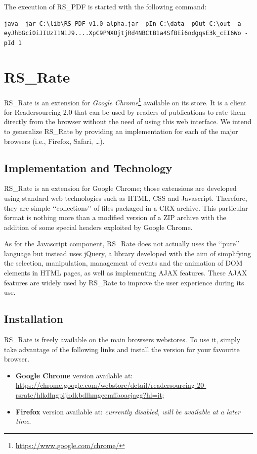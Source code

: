\documentclass[a4paper, english]{article}
\begin{document}
The execution of RS\_PDF is started with the following command:
\begin{lstlisting}
java -jar C:\lib\RS_PDF-v1.0-alpha.jar -pIn C:\data -pOut C:\out -a eyJhbGciOiJIUzI1NiJ9....XpC9PMXOjtjRd4NBCtB1a4SfBEi6ndgqsE3k_cEI6Wo -pId 1
\end{lstlisting}

\section{RS\_Rate}

\label{rs-rate}

RS\_Rate \cite{RS-Rate} is an extension for \emph{Google Chrome}\footnote{\url{https://www.google.com/chrome/}} available on its store. It is a client for Readersourcing 2.0 that can be used by readers of publications to rate them directly from the browser without the need of using this web interface. We intend to generalize RS\_Rate by providing an implementation for each of the major browsers (i.e., Firefox, Safari, \dots).

\subsection{Implementation and Technology}

RS\_Rate is an extension for Google Chrome; those extensions are developed using standard web technologies such as HTML, CSS and Javascript. Therefore, they are simple \lq\lq collections\rq\rq{} of files packaged in a CRX archive. This particular format is nothing more than a modified version of a ZIP archive with the addition of some special headers exploited by Google Chrome.

As for the Javascript component, RS\_Rate does not actually uses the \lq\lq pure\rq\rq{} language but instead uses jQuery, a library developed with the aim of simplifying the selection, manipulation, management of events and the animation of DOM elements in HTML pages, as well as implementing AJAX features. These AJAX features are widely used by RS\_Rate to improve the user experience during its use.

\subsection{Installation}

RS\_Rate is freely available on the main browsers webstores. To use it, simply take advantage of the following links and install the version for your favourite browser.
\begin{itemize}
\item \textbf{Google Chrome} version available at: \url{https://chrome.google.com/webstore/detail/readersourcing-20-rsrate/hlkdlngpijhdkbdlhmgeemffaoacjagg?hl=it};
\item \textbf{Firefox} version available at: \emph{currently disabled, will be available at a later time}.
\end{itemize}

\newpage

\printbibliography[heading=bibintoc]
\end{document}
